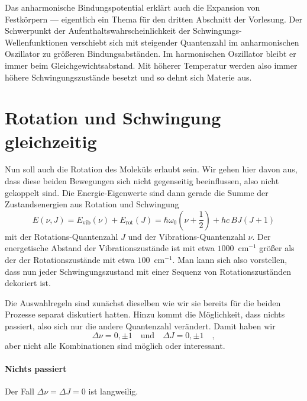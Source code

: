 Das anharmonische Bindungspotential erklärt auch die Expansion von Festkörpern --- eigentlich ein Thema für den dritten Abschnitt der Vorlesung. Der Schwerpunkt der Aufenthaltswahrscheinlichkeit der Schwingungs-Wellenfunktionen verschiebt sich mit steigender Quantenzahl im anharmonischen Oszillator zu größeren Bindungsabständen. Im harmonischen Oszillator bleibt er immer beim Gleichgewichtsabstand. Mit höherer Temperatur werden also immer höhere Schwingungszustände besetzt und so dehnt sich Materie aus.


\section{Rotation und Schwingung gleichzeitig}

Nun soll auch die Rotation des Moleküls erlaubt sein. Wir gehen hier davon aus, dass diese beiden Bewegungen sich nicht gegenseitig beeinflussen, also nicht gekoppelt sind. Die Energie-Eigenwerte sind dann gerade die Summe der Zustandsenergien aus Rotation und Schwingung%
\begin{equation}
E (\nu, J) = E_\text{vib}(\nu) + E_\text{rot}(J) = \hbar \omega_0 \left(\nu + \frac{1}{2} \right) + h c \, B J \left( J+1 \right) \label{eq:vib_rot_simple}
\end{equation}
mit der Rotations-Quantenzahl $J$ und der Vibrations-Quantenzahl $\nu$. Der energetische Abstand der Vibrationszustände ist mit etwa $1000$~cm$^{-1}$  größer als der der Rotationszustände mit etwa $100$~cm$^{-1}$. Man kann sich also vorstellen, dass nun jeder Schwingungszustand mit einer Sequenz von Rotationszuständen dekoriert ist.

Die Auswahlregeln sind zunächst dieselben wie wir sie bereits für die beiden Prozesse separat diskutiert hatten. Hinzu kommt die Möglichkeit, dass nichts passiert, also sich nur die andere Quantenzahl verändert. Damit haben wir
\begin{equation}
 \Delta \nu = 0, \pm 1 \quad \text{und} \quad \Delta J = 0, \pm 1  \quad ,
\end{equation}
aber nicht alle Kombinationen sind möglich oder interessant.

\paragraph{Nichts passiert} Der Fall $\Delta \nu = \Delta J = 0$ ist langweilig.

